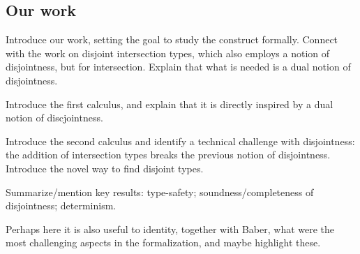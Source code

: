 

\subsection{Our work}


Introduce our work, setting the goal to study the construct formally.
Connect with the work on disjoint intersection types, which also
employs a notion of disjointness, but for intersection. Explain that
what is needed is a dual notion of disjointness.

Introduce the first calculus, and explain that it is directly inspired
by a dual notion of discjointness.

Introduce the second calculus and identify a technical challenge with
disjointness: the addition of intersection types breaks the previous
notion of disjointness. Introduce the novel way to find disjoint types.

Summarize/mention key results: type-safety; soundness/completeness of
disjointness; determinism.

Perhaps here it is also useful to identity, together with Baber, what
were the most challenging aspects in the formalization, and maybe
highlight these.


